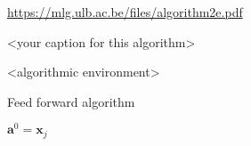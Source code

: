 \url{https://mlg.ulb.ac.be/files/algorithm2e.pdf}  %

\begin{algorithm}[H]
\caption{<your caption for this algorithm>}
\label{<your label for references later in your document>}
\begin{algorithmic}[1]  %
<algorithmic environment>
\end{algorithmic}
\end{algorithm}


\begin{algorithm}[H]
\caption{Feed forward algorithm}
\label{alg:FeedForward}
\begin{algorithmic}[1] 
        \State $\mathbf{a}^0 = \mathbf{x}_j$\;
\EndFor
\end{algorithmic}
\end{algorithm}